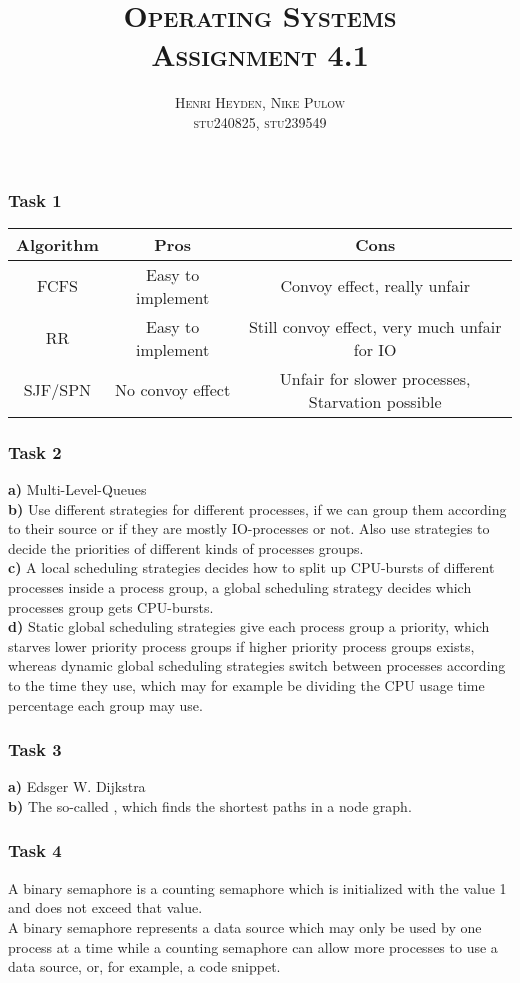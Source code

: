 \documentclass[12pt, a4paper]{article}
\title{\scshape Operating Systems\\Assignment 4.1}
\author{\scshape Henri Heyden, Nike Pulow \\ \small stu240825, stu239549}
\date{}
\begin{document}
\maketitle

\singlespacing
\subsubsection*{Task 1}
\begin{tabular}{c | c | c}
    Algorithm & Pros & Cons \\ \hline
    FCFS & Easy to implement & Convoy effect, really unfair \\
    RR & Easy to implement & Still convoy effect, very much unfair for IO \\
    SJF/SPN & No convoy effect & Unfair for slower processes, Starvation possible
\end{tabular}
\subsubsection*{Task 2}
\textbf{a)} Multi-Level-Queues \\
\textbf{b)} Use different strategies for different processes, if we can group them according to their source or if they are mostly IO-processes or not. Also use strategies to decide the priorities of different kinds of processes groups.\\
\textbf{c)} A local scheduling strategies decides how to split up CPU-bursts of different processes inside a process group, a global scheduling strategy decides which processes group gets CPU-bursts.\\
\textbf{d)} Static global scheduling strategies give each process group a priority, which starves lower priority process groups if higher priority process groups exists, whereas dynamic global scheduling strategies switch between processes according to the time they use, which may for example be dividing the CPU usage time percentage each group may use.
\subsubsection*{Task 3}
\textbf{a)} Edsger W. Dijkstra \\
\textbf{b)} The so-called , which finds the shortest paths in a node graph.
\subsubsection*{Task 4}
A binary semaphore is a counting semaphore which is initialized with the value 1 and does not exceed that value. \\
A binary semaphore represents a data source which may only be used by one process at a time while a counting semaphore can allow more processes to use a data source, or, for example, a code snippet.
\end{document}
